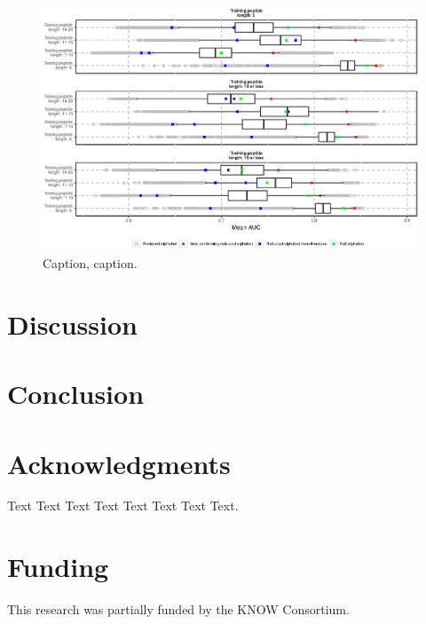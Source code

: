 \documentclass{bioinfo}
\begin{document}
\begin{figure}[!tpb]
\centerline{\includegraphics{figures/AUC_boxplot.eps}}
\caption{Caption, caption.}\label{fig:AUC_boxplot}
\end{figure}






\section{Discussion}









%
%






\section{Conclusion}



\section*{Acknowledgments}

Text Text Text Text Text Text  Text Text. 

\section*{Funding}

This research was partially funded by the KNOW Consortium.


%
%
%
%
%
%
%

\end{document}

